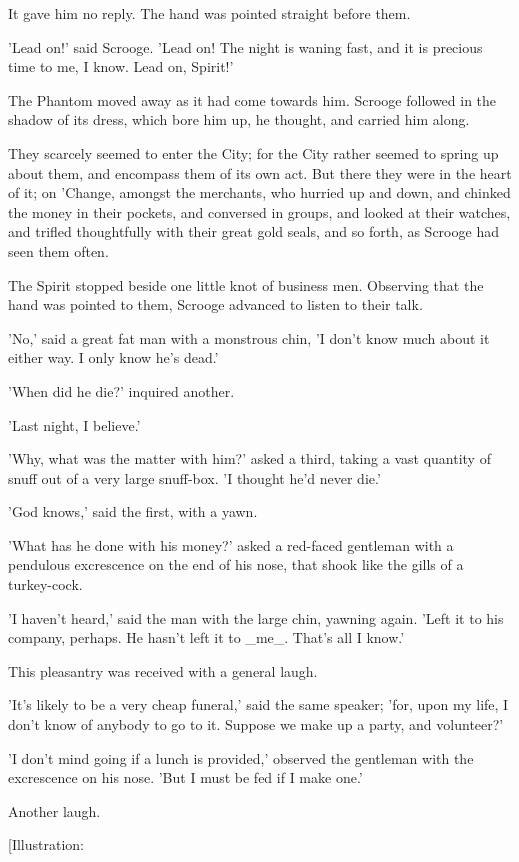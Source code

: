 It gave him no reply. The hand was pointed straight before them.

'Lead on!' said Scrooge. 'Lead on! The night is waning fast, and it is
precious time to me, I know. Lead on, Spirit!'

The Phantom moved away as it had come towards him. Scrooge followed in
the shadow of its dress, which bore him up, he thought, and carried him
along.

They scarcely seemed to enter the City; for the City rather seemed to
spring up about them, and encompass them of its own act. But there they
were in the heart of it; on 'Change, amongst the merchants, who hurried
up and down, and chinked the money in their pockets, and conversed in
groups, and looked at their watches, and trifled thoughtfully with their
great gold seals, and so forth, as Scrooge had seen them often.

The Spirit stopped beside one little knot of business men. Observing
that the hand was pointed to them, Scrooge advanced to listen to their
talk.

'No,' said a great fat man with a monstrous chin, 'I don't know much
about it either way. I only know he's dead.'

'When did he die?' inquired another.

'Last night, I believe.'

'Why, what was the matter with him?' asked a third, taking a vast
quantity of snuff out of a very large snuff-box. 'I thought he'd never
die.'

'God knows,' said the first, with a yawn.

'What has he done with his money?' asked a red-faced gentleman with a
pendulous excrescence on the end of his nose, that shook like the gills
of a turkey-cock.

'I haven't heard,' said the man with the large chin, yawning again.
'Left it to his company, perhaps. He hasn't left it to _me_. That's all
I know.'

This pleasantry was received with a general laugh.

'It's likely to be a very cheap funeral,' said the same speaker; 'for,
upon my life, I don't know of anybody to go to it. Suppose we make up a
party, and volunteer?'

'I don't mind going if a lunch is provided,' observed the gentleman with
the excrescence on his nose. 'But I must be fed if I make one.'

Another laugh.

[Illustration:

